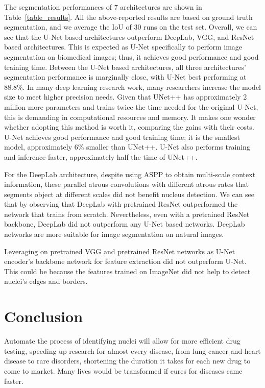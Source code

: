 \documentclass[conference]{IEEEtran}
\begin{document}
The segmentation performances of 7 architectures are shown in Table~\ref{table_results}. All the above-reported results are based on ground truth segmentation, and we average the IoU of 30 runs on the test set. Overall, we can see that the U-Net based architectures outperform DeepLab, VGG, and ResNet based architectures. This is expected as U-Net specifically to perform image segmentation on biomedical images; thus, it achieves good performance and good training time. Between the U-Net based architectures, all three architectures' segmentation performance is marginally close, with U-Net best performing at 88.8\%. In many deep learning research work, many researchers increase the model size to meet higher precision needs. Given that UNet++ has approximately 2 million more parameters and trains twice the time needed for the original U-Net, this is demanding in computational resources and memory. It makes one wonder whether adopting this method is worth it, comparing the gains with their costs. U-Net achieves good performance and good training time; it is the smallest model, approximately 6\% smaller than UNet++. U-Net also performs training and inference faster, approximately half the time of UNet++.

For the DeepLab architecture, despite using ASPP to obtain multi-scale context information, these parallel atrous convolutions with different atrous rates that segments object at different scales did not benefit nucleus detection. We can see that by observing that DeepLab with pretrained ResNet outperformed the network that trains from scratch. Nevertheless, even with a pretrained ResNet backbone, DeepLab did not outperform any U-Net based networks. DeepLab networks are more suitable for image segmentation on natural images.

Leveraging on pretrained VGG and pretrained ResNet networks as U-Net encoder's backbone network for feature extraction did not outperform U-Net. This could be because the features trained on ImageNet did not help to detect nuclei's edges and borders. 

\section{Conclusion}

Automate the process of identifying nuclei will allow for more efficient drug testing, speeding up research for almost every disease, from lung cancer and heart disease to rare disorders, shortening the duration it takes for each new drug to come to market. Many lives would be transformed if cures for diseases came faster.
\end{document}

